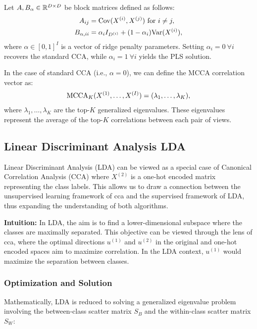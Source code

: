 Let $A,B_\alpha \in \mathbb{R}^{D \times D}$ be block matrices defined as follows:
\begin{align}
    A_{ij} &= \mathrm{Cov}(X^{(i)}, X^{(j)}) \text{ for } i \neq j, \\
    B_{\alpha,ii} &= \alpha_i I_{D^{(i)}} + (1-\alpha_i) \mathrm{Var}(X^{(i)}),
\end{align}
where $\alpha \in [0,1]^I$ is a vector of ridge penalty parameters. Setting $\alpha_i = 0 \: \forall i$ recovers the standard CCA, while $\alpha_i = 1 \: \forall i$ yields the PLS solution.

In the case of standard CCA (i.e., $\alpha=0$), we can define the MCCA correlation vector as:
\begin{align}\label{eq:MCCA}
    \operatorname{MCCA}_K(X^{(1)},\dots,X^{(I)}) = (\lambda_1, \dots, \lambda_K),
\end{align}
where $\lambda_1, \dots, \lambda_K$ are the top-$K$ generalized eigenvalues. These eigenvalues represent the average of the top-$K$ correlations between each pair of views.

\subsection{Linear Discriminant Analysis LDA}

Linear Discriminant Analysis (LDA) can be viewed as a special case of Canonical Correlation Analysis (CCA) where \(X^{(2)}\) is a one-hot encoded matrix representing the class labels.
This allows us to draw a connection between the unsupervised learning framework of \acrshort{cca} and the supervised framework of LDA\citep{balakrishnama1998linear,riffenburgh1957linear}, thus expanding the understanding of both algorithms.

\textbf{Intuition:} In LDA, the aim is to find a lower-dimensional subspace where the classes are maximally separated. This objective can be viewed through the lens of \acrshort{cca}, where the optimal directions \(u^{(1)}\) and \(u^{(2)}\) in the original and one-hot encoded spaces aim to maximize correlation. In the LDA context, \(u^{(1)}\) would maximize the separation between classes.

\subsubsection{Optimization and Solution}

Mathematically, LDA is reduced to solving a generalized eigenvalue problem involving the between-class scatter matrix \(S_B\) and the within-class scatter matrix \(S_W\):

